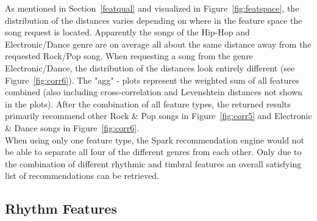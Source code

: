 \noindent As mentioned in Section~\ref{featqual} and visualized in Figure~\ref{fig:featspace}, the distribution of the distances varies depending on where in the feature space the song request is located. Apparently the songs of the Hip-Hop and Electronic/Dance genre are on average all about the same distance away from the requested Rock/Pop song. When requesting a song from the genre Electronic/Dance, the distribution of the distances look entirely different (see Figure~\ref{fig:corr6}).
\noindent The "agg" - plots represent the weighted sum of all features combined (also including cross-correlation and Levenshtein distances not shown in the plots). After the combination of all feature types, the returned results primarily recommend other Rock \& Pop songs in Figure~\ref{fig:corr5} and Electronic \& Dance songs in Figure~\ref{fig:corr6}.\\
When using only one feature type, the Spark recommendation engine would not be able to separate all four of the different genres from each other. Only due to the combination of different rhythmic and timbral features an overall satisfying list of recommendations can be retrieved.\\

\subsection{Rhythm Features}\label{rhythmrec}

